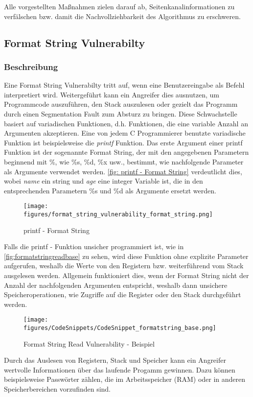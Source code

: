 \documentclass[a4paper,
DIV=13,
12pt,
BCOR=10mm,
department=FakIM,
oneside,
parskip=half,
automark,
listof=totocnumbered,
bibliography=totocnumbered,
acronym=totocnumbered
] {OTHRartcl}
\begin{document}
Alle vorgestellten Maßnahmen zielen darauf ab, Seitenkanalinformationen zu verfälschen bzw. damit die Nachvollziehbarkeit des Algorithmus zu erschweren.

\subsection{Format String Vulnerabilty}
\subsubsection{Beschreibung}
Eine Format String Vulnerabilty tritt auf, wenn eine Benutzereingabe als Befehl interpretiert wird.
Weitergeführt kann ein Angreifer dies ausnutzen, um Programmcode auszuführen, den Stack auszulesen oder gezielt das Programm durch einen Segmentation Fault zum Absturz zu bringen.
Diese Schwachstelle basiert auf variadischen Funktionen, d.h. Funktionen, die eine variable Anzahl an Argumenten akzeptieren.
Eine von jedem C Programmierer benutzte variadische Funktion ist beispielsweise die \textit{printf} Funktion. \cite{OWASP Format String Vuln.}
Das erste Argument einer printf Funktion ist der sogenannte Format String, der mit den angegebenen Parametern beginnend mit \%, wie \%s, \%d, \%x usw., bestimmt, wie nachfolgende Parameter
als Argumente verwendet werden.
\autoref{fig: printf - Format String} verdeutlicht dies, wobei \textit{name} ein string und \textit{age} eine integer Variable ist, die in den entsprechenden
Parametern \%s und \%d als Argumente ersetzt werden.
\begin{figure}[ht!]
  \begin{center}
    \texttt{[image: figures/format\_string\_vulnerability\_format\_string.png]}
    \caption{printf - Format String}
    \label{fig: printf - Format String}
  \end{center}
\end{figure}

Falls die printf - Funktion unsicher programmiert ist, wie in \autoref{fig:formatstringreadbase} zu sehen,
wird diese Funktion ohne explizite Parameter aufgerufen, weshalb die Werte von den Registern bzw. weiterführend vom Stack ausgelesen werden.
Allgemein funktioniert dies, wenn der Format String nicht der Anzahl der nachfolgenden Argumenten entspricht, weshalb dann unsichere Speicheroperationen, wie Zugriffe auf die Register oder den Stack
durchgeführt werden.
\begin{figure}[ht!]
  \begin{center}
    \texttt{[image: figures/CodeSnippets/CodeSnippet\_formatstring\_base.png]}
    \caption{Format String Read Vulnerability - Beispiel}
    \label{fig:formatstringreadbase}
  \end{center}
\end{figure}
Durch das Auslesen von Registern, Stack und Speicher kann ein Angreifer wertvolle Informationen über das laufende Progamm gewinnen.
Dazu können beispielsweise Passwörter zählen, die im Arbeitsspeicher (RAM) oder in anderen Speicherbereichen vorzufinden sind.
\end{document}
